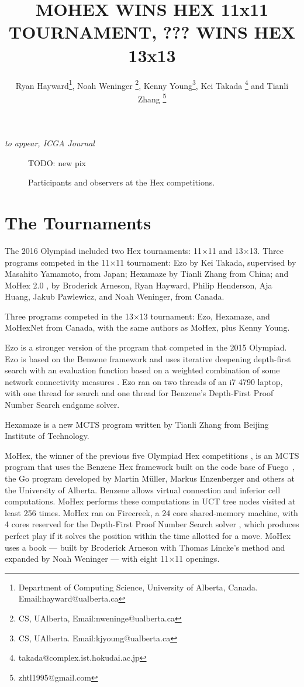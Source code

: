 \documentclass{icga}
\title{\sc MOHEX WINS HEX 11x11 TOURNAMENT, ??? WINS HEX 13x13}
\author{Ryan Hayward\thanks{Department 
of Computing Science, University of Alberta, Canada. Email:hayward@ualberta.ca},
Noah Weninger \thanks{CS, UAlberta, Email:nweninge@ualberta.ca},
Kenny Young\thanks{CS, UAlberta. Email:kjyoung@ualberta.ca},
Kei Takada \thanks{takada@complex.ist.hokudai.ac.jp} and
Tianli Zhang \thanks{zhtl1995@gmail.com}
}
\affiliation{Edmonton, Canada}
\newif\iflong\longfalse  %
\def\Eo{\mbox{\sc Ezo}}
\def\Hz{\mbox{\sc Hexamaze}}
\def\Mx{\mbox{\sc MoHex}}
\def\Mt{\mbox{\sc MoHexNet}}
\def\Fuego{\mbox{\sc Fuego}}
\begin{document}
\maketitle

\iflong
In the longer version of the report, we include all games.
\fi

\vspace*{-2.25in}
{\it to appear, ICGA Journal}
\vspace*{2.0in}

\begin{figure}[hbt]
TODO: new pix

\caption{Participants and observers at the Hex competitions.}
\end{figure}


\section{The Tournaments}
The 2016 Olympiad included
two Hex tournaments: 11$\times$11 and 13$\times$13.
Three programs competed in the 11$\times$11 tournament:
\Eo{} by Kei Takada, supervised by Masahito Yamamoto, from Japan;
\Hz{} by Tianli Zhang from China; and
\Mx{} 2.0 , 
by Broderick Arneson, Ryan Hayward, Philip Henderson, Aja Huang, 
Jakub Pawlewicz, and Noah Weninger, from Canada.

Three programs competed in the 13$\times$13 tournament:
\Eo{}, \Hz{}, and \Mt{} from Canada,
with the same authors as \Mx{}, plus Kenny Young.

\Eo{} is a stronger version of the program that competed in the 2015 Olympiad.
\Eo{} is based on the Benzene framework and uses iterative deepening depth-first search with an evaluation function based on a weighted combination of some network connectivity measures .
\Eo{} ran on two threads of an i7 4790 laptop,
with one thread for search and one thread for
Benzene's Depth-First Proof Number Search endgame solver.

\Hz{} is a new MCTS program written by Tianli Zhang from 
Beijing Institute of Technology.

\Mx{}, the winner of the previous five Olympiad Hex competitions
,
is an MCTS program that uses the Benzene Hex framework
built on the code base of \Fuego\ ,
the Go program developed by Martin M\"{u}ller, Markus Enzenberger
and others at the University of Alberta.
Benzene allows virtual connection and
inferior cell computations.
\Mx{} performs these computations in UCT tree nodes visited at least 256 times.
\Mx{} ran on Firecreek, a 24 core shared-memory machine, 
with 4 cores reserved for the 
Depth-First Proof Number Search solver , which
produces perfect play if it solves the
position within the time allotted for a move.
\Mx{} uses a book ---
built by Broderick Arneson with Thomas Lincke's method 
and expanded by Noah Weninger ---
with eight 11$\times$11 openings.
\end{document}
